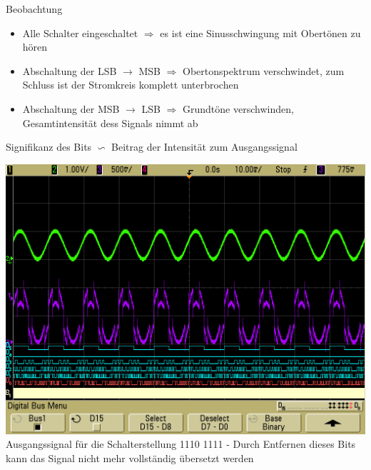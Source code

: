 \documentclass[compress,11pt]{beamer}
\begin{document}
\begin{frame}
\begin{block}{Beobachtung}
\begin{itemize}
\item Alle Schalter eingeschaltet $\Rightarrow$ es ist eine Sinusschwingung mit Obertönen zu hören
\item Abschaltung der LSB $\rightarrow$ MSB  $\Rightarrow$ Obertonspektrum verschwindet, zum Schluss ist der Stromkreis komplett unterbrochen
\item  Abschaltung der MSB $\rightarrow$ LSB  $\Rightarrow$
Grundtöne verschwinden, Gesamtintensität dess Signals nimmt ab
\end{itemize}
Signifikanz des Bits $\backsim$ Beitrag der Intensität zum Ausgangssignal
\end{block}
\end{frame}
\begin{frame}
\includegraphics[width=.7\textwidth]{../vales_zeug/scope_132}\\
Ausgangssignal für die Schalterstellung 1110 1111 - Durch Entfernen dieses Bits kann das Signal nicht mehr vollständig übersetzt werden 
\end{frame}
\end{document}
